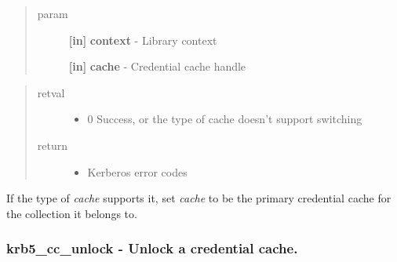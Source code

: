 \documentclass[letterpaper,10pt,english]{sphinxmanual}
\begin{document}
\begin{quote}\begin{description}
\item[{param}] \leavevmode
\textbf{{[}in{]}} \textbf{context} - Library context

\textbf{{[}in{]}} \textbf{cache} - Credential cache handle

\end{description}\end{quote}
\begin{quote}\begin{description}
\item[{retval}] \leavevmode\begin{itemize}
\item {} 
0   Success, or the type of cache doesn't support switching

\end{itemize}

\item[{return}] \leavevmode\begin{itemize}
\item {} 
Kerberos error codes

\end{itemize}

\end{description}\end{quote}

If the type of \emph{cache} supports it, set \emph{cache} to be the primary credential cache for the collection it belongs to.


\subsubsection{krb5\_cc\_unlock -  Unlock a credential cache.}
\label{appdev/refs/api/krb5_cc_unlock:krb5-cc-unlock-unlock-a-credential-cache}\label{appdev/refs/api/krb5_cc_unlock::doc}

\begin{fulllineitems}
\label{appdev/refs/api/krb5_cc_unlock:c.krb5_cc_unlock}
\end{fulllineitems}
\end{document}
